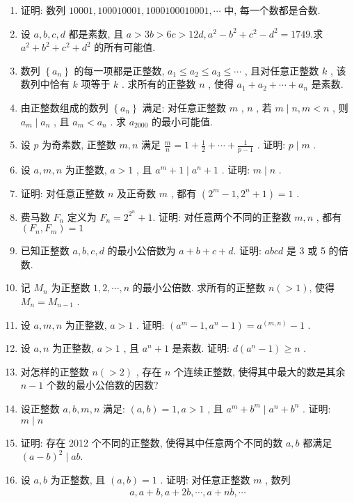 \begin{enumerate}
    \item 证明: 数列 $10001,100010001,1000100010001, \cdots$ 中, 每一个数都是合数.
    \item 设 $a ,  b ,  c ,  d$ 都是素数, 且 $a>3 b>6 c>12 d, a^{2}-b^{2}+c^{2}-d^{2}=1749$.求 $a^{2}+b^{2}+c^{2}+d^{2}$ 的所有可能值. 
    \item 数列 $\left\{a_{n}\right\}$ 的每一项都是正整数,  $a_{1} \leqslant a_{2} \leqslant a_{3} \leqslant \cdots$ , 且对任意正整数 $k$ , 该数列中恰有 $k$ 项等于 $k$ . 求所有的正整数 $n$ , 使得 $a_{1}+a_{2}+\cdots+a_{n}$ 是素数. 
    \item 由正整数组成的数列 $\left\{a_{n}\right\}$ 满足: 对任意正整数 $m$ ,  $n$ , 若 $m \mid n ,  m<n$ , 则 $a_{m} \mid a_{n}$ , 且 $a_{m}<a_{n}$ . 求 $a_{2000}$ 的最小可能值. 
    \item 设 $p$ 为奇素数, 正整数 $m ,  n$ 满足 $\frac{m}{n}=1+\frac{1}{2}+\cdots+\frac{1}{p-1}$ . 证明:  $p \mid m$ . 
    \item 设 $a ,  m ,  n$ 为正整数,  $a>1$ , 且 $a^{m}+1 \mid a^{n}+1$ . 证明:  $m \mid n$ . 
    \item 证明: 对任意正整数 $n$ 及正奇数 $m$ , 都有 $\left(2^{m}-1,2^{n}+1\right)=1$ . 
    \item 费马数 $F_{n}$ 定义为 $F_{n}=2^{2^{n}}+1$. 证明: 对任意两个不同的正整数 $m ,  n$ , 都有 $\left(F_{n}, F_{m}\right)=1$
    \item 已知正整数 $a ,  b ,  c ,  d$ 的最小公倍数为 $a+b+c+d$. 证明: $a b c d$ 是 3 或 5 的倍数. 
    \item 记 $M_{n}$ 为正整数 $1,2, \cdots, n$ 的最小公倍数. 求所有的正整数 $n(>1)$, 使得 $M_{n}=M_{n-1}$ . 
    \item 设 $a ,  m ,  n$ 为正整数,  $a>1$ . 证明:  $\left(a^{m}-1, a^{n}-1\right)=a^{(m, n)}-1$ . 
    \item 设 $a ,  n$ 为正整数,  $a>1$ , 且 $a^{n}+1$ 是素数. 证明:  $d\left(a^{n}-1\right) \geqslant n$ . 
    \item 对怎样的正整数 $n(>2)$ , 存在 $n$ 个连续正整数, 使得其中最大的数是其余 $n-1$ 个数的最小公倍数的因数?
    \item 设正整数 $a ,  b ,  m ,  n$ 满足:  $(a, b)=1, a>1$ , 且 $a^{m}+b^{m} \mid a^{n}+b^{n}$ . 证明:  $m \mid n$
    \item 证明: 存在 2012 个不同的正整数, 使得其中任意两个不同的数 $a ,  b$ 都满足 $(a-b)^{2} \mid a b$.
    \item 设 $a ,  b$ 为正整数, 且 $(a, b)=1$ . 证明: 对任意正整数 $m$ , 数列
    \begin{align*}
        a, a+b, a+2 b, \cdots, a+n b, \cdots

\end{align*}
\end{enumerate}
